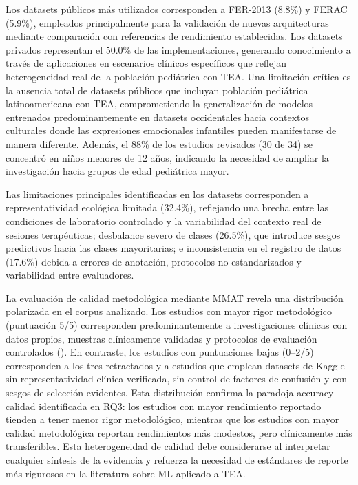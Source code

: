 \documentclass[3p,twocolumn,times]{elsarticle}
\begin{document}
	Los datasets públicos más utilizados corresponden a FER-2013 (8.8\%) y FERAC
	(5.9\%), empleados principalmente para la validación de nuevas arquitecturas
	mediante comparación con referencias de rendimiento establecidas. Los datasets
	privados representan el 50.0\% de las implementaciones, generando conocimiento a
	través de aplicaciones en escenarios clínicos específicos que reflejan
	heterogeneidad real de la población pediátrica con TEA. Una limitación crítica es
	la ausencia total de datasets públicos que incluyan población pediátrica
	latinoamericana con TEA, comprometiendo la generalización de modelos entrenados
	predominantemente en datasets occidentales hacia contextos culturales donde las
	expresiones emocionales infantiles pueden manifestarse de manera diferente. Además,
	el 88\% de los estudios revisados (30 de 34) se concentró en niños menores de 12
	años, indicando la necesidad de ampliar la investigación hacia grupos de edad
	pediátrica mayor.
	
	Las limitaciones principales identificadas en los datasets corresponden a
	representatividad ecológica limitada (32.4\%), reflejando una brecha entre las
	condiciones de laboratorio controlado y la variabilidad del contexto real de
	sesiones terapéuticas; desbalance severo de clases (26.5\%), que introduce sesgos
	predictivos hacia las clases mayoritarias; e inconsistencia en el registro de datos
	(17.6\%) debida a errores de anotación, protocolos no estandarizados y variabilidad
	entre evaluadores.
	
	La evaluación de calidad metodológica mediante MMAT revela una distribución
	polarizada en el corpus analizado. Los estudios con mayor rigor metodológico
	(puntuación 5/5) corresponden predominantemente a investigaciones clínicas con
	datos propios, muestras clínicamente validadas y protocolos de evaluación
	controlados (\cite{He2019,Reed2021,Hwang2024,Radocaj2025,Washington2022,Sariyanidi2025,Hassan2025,Rudovic2018,Papaioannou2021,Rudovic2019,Dapogny2019,Leo2018,Xu2023,OSullivan2023}).
	En contraste, los estudios con puntuaciones bajas (0--2/5) corresponden a los tres
	retractados y a estudios que emplean datasets de Kaggle sin representatividad
	clínica verificada, sin control de factores de confusión y con sesgos de selección
	evidentes. Esta distribución confirma la paradoja accuracy-calidad identificada en
	RQ3: los estudios con mayor rendimiento reportado tienden a tener menor rigor
	metodológico, mientras que los estudios con mayor calidad metodológica reportan
	rendimientos más modestos, pero clínicamente más transferibles. Esta heterogeneidad
	de calidad debe considerarse al interpretar cualquier síntesis de la evidencia y
	refuerza la necesidad de estándares de reporte más rigurosos en la literatura sobre
	ML aplicado a TEA.
	
\end{document}
